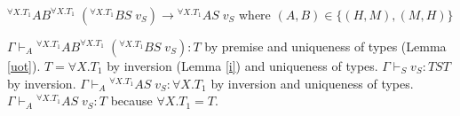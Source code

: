 \begin{case}
$^{\forall X.T_{1}}AB^{\forall X.T_{1}}\;(^{\forall X.T_{1}}BS\;v_{S})\rightarrow{^{\forall X.T_{1}}A}S\;v_{S}$ where $(A,B)\in\lbrace(H,M),(M,H)\rbrace$

$\Gamma\vdash_{A}{^{\forall X.T_{1}}A}B^{\forall X.T_{1}}\;(^{\forall X.T_{1}}BS\;v_{S}):T$ by premise and uniqueness of types (Lemma \ref{uot}).  $T=\forall X.T_{1}$ by inversion (Lemma \ref{i}) and uniqueness of types.  $\Gamma\vdash_{S}v_{S}:TST$ by inversion.  $\Gamma\vdash_{A}{^{\forall X.T_{1}}A}S\;v_{S}:\forall X.T_{1}$ by inversion and uniqueness of types.  $\Gamma\vdash_{A}{^{\forall X.T_{1}}A}S\;v_{S}:T$ because $\forall X.T_{1}=T$.
\end{case}
